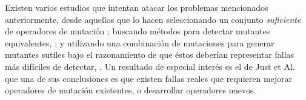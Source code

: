 Existen varios estudios que intentan atacar los problemas mencionados anteriormente, desde aquellos que lo hacen seleccionando un conjunto \emph{suficiente} de operadores de mutaci\'on \cite{bibliography.mutation.selection.Offutt96, bibliography.mutation.selection.ASN2008}; buscando m\'etodos para detectar mutantes equivalentes, \cite{biblography.mutation.evaluation.equivalent.Grun+09, biblography.mutation.evaluation.equivalent.Schuler+10, biblography.mutation.evaluation.equivalent.Schuler+13, biblography.mutation.evaluation.equivalent.Just+13}; y utilizando una combinaci\'on de mutaciones para generar mutantes sut\'iles bajo el razonamiento de que \'estos deber\'ian representar fallas m\'as dif\'iciles de detectar, \cite{bibliography.mutation.highorder.Jia+08, bibliography.mutation.highorder.Jia+09, bibliography.mutation.highorder.Harman+11}. Un resultado de especial inter\'es es el de Just et Al. \cite{bibliography.mutation.evaluation.valid-substitute} que una de sus conclusiones es que existen fallas reales que requieren mejorar operadores de mutaci\'on existentes, o desarrollar operadores nuevos.








